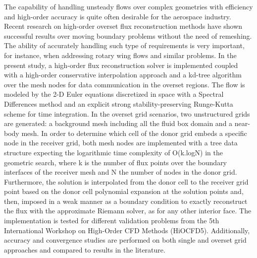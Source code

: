 The capability of handling unsteady flows over complex geometries with efficiency and high-order accuracy is quite often desirable for the aerospace industry. Recent research on high-order overset flux reconstruction methods have shown successful results over moving boundary problems without the need of remeshing. The ability of accurately handling such type of requirements is very important, for instance, when addressing rotary wing flows and similar problems. In the present study, a high-order flux reconstruction solver is implemented coupled with a high-order conservative interpolation approach and a kd-tree algorithm over the mesh nodes for data communication in the overset regions. The flow is modeled by the 2-D Euler equations discretized in space with a Spectral Differences method and an explicit strong stability-preserving Runge-Kutta scheme for time integration. In the overset grid scenarios, two unstructured grids are generated: a background mesh including all the fluid box domain and a near-body mesh. In order to determine which cell of the donor grid embeds a specific node in the receiver grid, both mesh nodes are implemented with a tree data structure expecting the logarithmic time complexity of O(k.logN) in the geometric search, where k is the number of flux points over the boundary interfaces of the receiver mesh and N the number of nodes in the donor grid. Furthermore, the solution is interpolated from the donor cell to the receiver grid point based on the donor cell polynomial expansion at the solution points and, then, imposed in a weak manner as a boundary condition to exactly reconstruct the flux with the approximate Riemann solver, as for any other interior face. The implementation is tested for different validation problems from the 5th International Workshop on High-Order CFD Methods (HiOCFD5). Additionally, accuracy and convergence studies are performed on both single and overset grid approaches and compared to results in the literature.